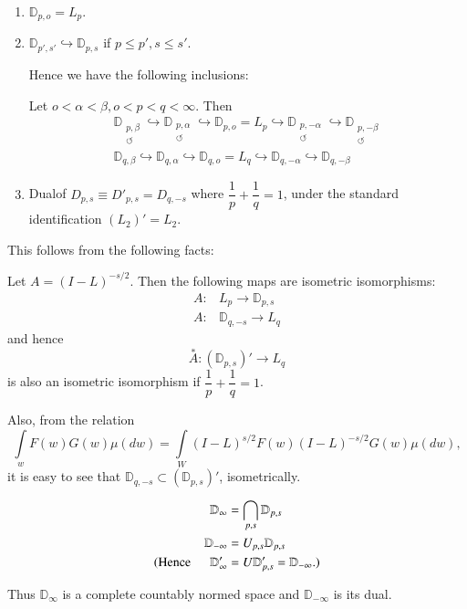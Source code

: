 \begin{fact}
  \begin{enumerate}[\rm 1)]
  \item $\mathbb{D}_{p,o} = L_p$.
  \item $\mathbb{D}_{p',s'} \hookrightarrow \mathbb{D}_{p,s}$ if $p \leq
    p', s \leq s'$. 

    Hence we have the following inclusions:
    
    Let $o < \alpha < \beta, o < p < q < \infty$. Then
    \begin{gather*}
      \mathbb{D}_{\substack{p,\beta\\ \circlearrowleft}} \hookrightarrow
      \mathbb{D}_{\substack{p,\alpha \\ \circlearrowleft}} \hookrightarrow
      \mathbb{D}_{p,o} = L_p \hookrightarrow
      \mathbb{D}_{\substack{p,-\alpha \\ \circlearrowleft}}
      \hookrightarrow  \mathbb{D}_{\substack{p,-\beta\\ \circlearrowleft}}\\ 
      \mathbb{D}_{q, \beta} \hookrightarrow  \mathbb{D}_{q, \alpha}
      \hookrightarrow  \mathbb{D}_{q, o} = L_q \hookrightarrow
      \mathbb{D}_{q,-\alpha} \hookrightarrow  \mathbb{D}_{q, -\beta} 
    \end{gather*}

  \item  Dual\pageoriginale of $D_{p, s}  \equiv D'_{p, s} = D_{q, -s}$ where
    $\dfrac{1}{p} + \dfrac{1}{q} = 1$, under the standard
    identification $(L_2)' = L_2$. 
  \end{enumerate}
\end{fact}

This follows from the following facts:

Let $A = (I - L)^{-s/2}$. Then the following maps are isometric isomorphisms:
\begin{align*}
  A: & L_p \to \mathbb{D}_{p, s}\\
  A: & \mathbb{D}_{q, - s} \to L_q
\end{align*}
and hence
$$
\overset{\ast}{A}: (\mathbb{D}_{p, s})' \to L_q
$$
is also an isometric isomorphism if $\dfrac{1}{p} + \dfrac{1}{q} = 1$.

Also, from the relation
$$
\int\limits_w F(w) G (w) \mu (dw) = \int\limits_W (I - L)^{s / 2} F(w)
(I-L)^{-s/2} G (w) \mu (dw), 
$$
it is easy to see that $\mathbb{D}_{q, - s} \subset (\mathbb{D}_{p,
  s})'$, isometrically. 


\begin{definition} %
  \begin{align*}
    \mathbb{D}_{\infty} & = \bigcap_{p, s} \mathbb{D}_{p, s}\\
    \mathbb{D}_{- \infty} & = U_{p, s} \mathbb{D}_{p, s}\\
    ({\rm Hence } \quad ~~ \mathbb{D}'_{\infty} & = U \mathbb{D}'_{p, s}
    = \mathbb{D}_{- \infty}. )
  \end{align*}

Thus $\mathbb{D}_ \infty$ is a complete countably normed space and
$\mathbb{D}_{- \infty} $ is its dual. 
\end{definition}

